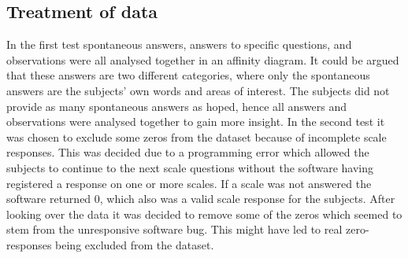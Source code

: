 \subsection{Treatment of data}
In the first test spontaneous answers, answers to specific questions, and observations were all analysed together in an affinity diagram. It could be argued that these answers are two different categories, where only the spontaneous answers are the subjects' own words and areas of interest. The subjects did not provide as many spontaneous answers as hoped, hence all answers and observations were analysed together to gain more insight. 
In the second test it was chosen to exclude some zeros from the dataset because of incomplete scale responses. This was decided due to a programming error which allowed the subjects to continue to the next scale questions without the software having registered a response on one or more scales. If a scale was not answered the software returned 0, which also was a valid scale response for the subjects. After looking over the data it was decided to remove some of the zeros which seemed to stem from the unresponsive software bug. This might have led to real zero-responses being excluded from the dataset.